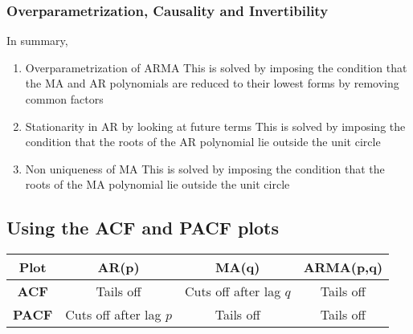 \documentclass[../../time_series_notes.tex]{subfiles}
\begin{document}
\subsubsection{Overparametrization, Causality and Invertibility}
In summary,
\begin{enumerate}
    \item Overparametrization of ARMA\newline
         This is solved by imposing the condition that the MA and AR polynomials are reduced to their lowest forms by removing common factors
    \item Stationarity in AR by looking at future terms\newline
        This is solved by imposing the condition that the roots of the AR polynomial lie outside the unit circle
    \item Non uniqueness of MA\newline
        This is solved by imposing the condition that the roots of the MA polynomial lie outside the unit circle
\end{enumerate}

\subsection{Using the ACF and PACF plots}
\begin{table}
\centering
\begin{tabular}{c|c|c|c}
    Plot & \textbf{AR(p)} & \textbf{MA(q)} & \textbf{ARMA(p,q)}\\ \hline
    \textbf{ACF} & Tails off & Cuts off after lag $q$ & Tails off\\ \hline
    \textbf{PACF} & Cuts off after lag $p$ & Tails off & Tails off\\
\end{tabular}
\end{table}
\end{document}
